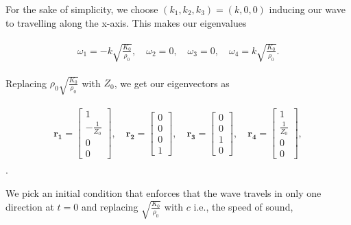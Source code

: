 For the sake of simplicity, we choose $\left(k_1,k_2,k_3\right) = \left(k,0,0\right)$ inducing our wave to travelling along the x-axis. This makes our eigenvalues

\begin{align}
    \begin{split}
        \omega_1 = -k \sqrt{\frac{K_{0}}{\rho_{0}}}, \quad
        \omega_2 = 0, \quad
        \omega_3 = 0, \quad
        \omega_4 = k \sqrt{\frac{K_{0}}{\rho_{0}}} .
    \end{split}
\end{align}

Replacing $\rho_0 \sqrt{\frac{K_0}{\rho_0}}$ with $Z_0$, we get our eigenvectors as

\begin{align}
    \begin{split}
    \mathbf{r_1} = \begin{bmatrix}
        1 \\
-\frac{1}{Z_0} \\
0 \\
0
        \end{bmatrix}, \quad
        \mathbf{r_2} = \begin{bmatrix}
            0 \\
0 \\
0 \\
1
            \end{bmatrix}, \quad
            \mathbf{r_3} = \begin{bmatrix}
                0 \\
                0 \\
                1 \\
                0
                \end{bmatrix}, \quad
                \mathbf{r_4} = \begin{bmatrix}
                    1 \\
                    \frac{1}{Z_0} \\
                    0 \\
                    0                    
                \end{bmatrix},
    \end{split}
\end{align} .

We pick an initial condition that enforces that the wave travels in only one direction at $t=0$ and replacing $\sqrt{\frac{K_{0}}{\rho_{0}}}$ with $c$ i.e.,
the speed of sound,


